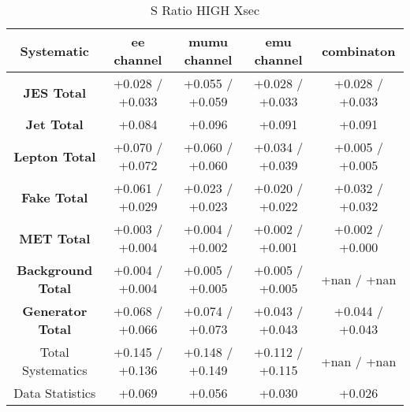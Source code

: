 \begin{table}[htbp]
\scriptsize
  \begin{center} 
  \begin{tabular}{|c|c|c|c|c|}
  \hline
   Systematic                            &  ee channel&  mumu channel&  emu channel&  combinaton\\
 \hline
\textbf{JES Total}                    &+0.028   / +0.033   & +0.055   / +0.059   & +0.028   / +0.033   & +0.028   / +0.033  \\
\textbf{Jet Total}                    &+0.084              & +0.096              & +0.091              & +0.091             \\
\textbf{Lepton Total}                 &+0.070   / +0.072   & +0.060   / +0.060   & +0.034   / +0.039   & +0.005   / +0.005  \\
\textbf{Fake Total}                   &+0.061   / +0.029   & +0.023   / +0.023   & +0.020   / +0.022   & +0.032   / +0.032  \\
\textbf{MET Total}                    &+0.003   / +0.004   & +0.004   / +0.002   & +0.002   / +0.001   & +0.002   / +0.000  \\
\textbf{Background Total}             &+0.004   / +0.004   & +0.005   / +0.005   & +0.005   / +0.005   & +nan     / +nan    \\
\textbf{Generator Total}              &+0.068   / +0.066   & +0.074   / +0.073   & +0.043   / +0.043   & +0.044   / +0.043  \\
  \hline
  \hline
Total Systematics                     &+0.145   / +0.136   & +0.148   / +0.149   & +0.112   / +0.115   & +nan     / +nan    \\
Data Statistics                       &+0.069              & +0.056              & +0.030              & +0.026             \\
  \hline
  \end{tabular}
  \end{center} 
  \label{tab:xsec_nominal_sratio_high}
  \caption{S Ratio HIGH Xsec}
\end{table}

